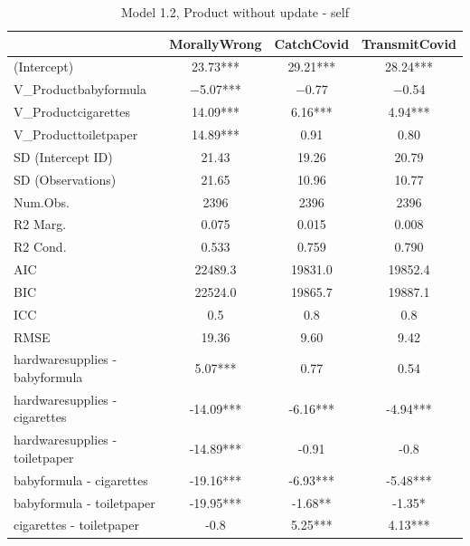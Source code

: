 \documentclass[]{report}
\begin{document}
\begin{table}
	
	\caption{Model 1.2, Product without update - self}
	\centering
	\begin{tabular}[t]{lccc}
		\toprule
		& MorallyWrong & CatchCovid & TransmitCovid\\
		\midrule
(Intercept) & \num{23.73}*** & \num{29.21}*** & \num{28.24}***\\
V\_Productbabyformula & \num{-5.07}*** & \num{-0.77} & \num{-0.54}\\
V\_Productcigarettes & \num{14.09}*** & \num{6.16}*** & \num{4.94}***\\
V\_Producttoiletpaper & \num{14.89}*** & \num{0.91} & \num{0.80}\\
SD (Intercept ID) & \num{21.43} & \num{19.26} & \num{20.79}\\
SD (Observations) & \num{21.65} & \num{10.96} & \num{10.77}\\
\midrule
Num.Obs. & \num{2396} & \num{2396} & \num{2396}\\
R2 Marg. & \num{0.075} & \num{0.015} & \num{0.008}\\
R2 Cond. & \num{0.533} & \num{0.759} & \num{0.790}\\
AIC & \num{22489.3} & \num{19831.0} & \num{19852.4}\\
BIC & \num{22524.0} & \num{19865.7} & \num{19887.1}\\
ICC & \num{0.5} & \num{0.8} & \num{0.8}\\
RMSE & \num{19.36} & \num{9.60} & \num{9.42}\\
		 \hline
		 hardwaresupplies - babyformula & 5.07*** & 0.77 & 0.54 \\ 
		 hardwaresupplies - cigarettes & -14.09*** & -6.16*** & -4.94*** \\ 
		 hardwaresupplies - toiletpaper & -14.89*** & -0.91 & -0.8 \\ 
		 babyformula - cigarettes & -19.16*** & -6.93*** & -5.48*** \\ 
		 babyformula - toiletpaper & -19.95*** & -1.68** & -1.35* \\ 
		 cigarettes - toiletpaper & -0.8 & 5.25*** & 4.13*** \\ 
		 \bottomrule
	\end{tabular}
\end{table}
\end{document}
